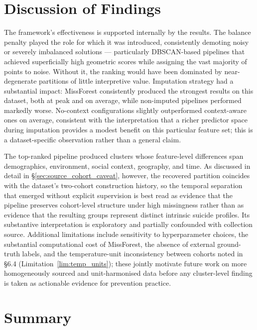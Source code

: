 \section{Discussion of Findings}\label{sec:discussion_of_findings}

The framework's effectiveness is supported internally by the results. The balance penalty played the role for which it was introduced, consistently demoting noisy or severely imbalanced solutions --- particularly DBSCAN-based pipelines that achieved superficially high geometric scores while assigning the vast majority of points to noise. Without it, the ranking would have been dominated by near-degenerate partitions of little interpretive value. Imputation strategy had a substantial impact: MissForest consistently produced the strongest results on this dataset, both at peak and on average, while non-imputed pipelines performed markedly worse. No-context configurations slightly outperformed context-aware ones on average, consistent with the interpretation that a richer predictor space during imputation provides a modest benefit on this particular feature set; this is a dataset-specific observation rather than a general claim.

The top-ranked pipeline produced clusters whose feature-level differences span demographics, environment, social context, geography, and time. As discussed in detail in \S\ref{sec:source_cohort_caveat}, however, the recovered partition coincides with the dataset's two-cohort construction history, so the temporal separation that emerged without explicit supervision is best read as evidence that the pipeline preserves cohort-level structure under high missingness rather than as evidence that the resulting groups represent distinct intrinsic suicide profiles. Its substantive interpretation is exploratory and partially confounded with collection source. Additional limitations include sensitivity to hyperparameter choices, the substantial computational cost of MissForest, the absence of external ground-truth labels, and the temperature-unit inconsistency between cohorts noted in \S6.4 (Limitation~\ref{lim:temp_units}); these jointly motivate future work on more homogeneously sourced and unit-harmonised data before any cluster-level finding is taken as actionable evidence for prevention practice.

\section{Summary}

